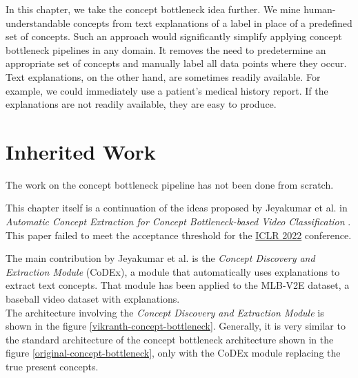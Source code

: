 In this chapter, we take the concept bottleneck idea further.
We mine human-understandable concepts from text explanations of a label in place of a predefined set of concepts.
Such an approach would significantly simplify applying concept bottleneck pipelines in any domain.
It removes the need to predetermine an appropriate set of concepts and manually label all data points where they occur.
Text explanations, on the other hand, are sometimes readily available. For example, we could immediately use a patient's medical history report.
If the explanations are not readily available, they are easy to produce.


\section{Inherited Work}
\label{inherited-work}

The work on the concept bottleneck pipeline has not been done from scratch.

This chapter itself is a continuation of the ideas proposed by Jeyakumar et al. in \emph{Automatic Concept Extraction for Concept Bottleneck-based Video Classification} \cite{RefWorks:RefID:16-2021automatic}. This paper failed to meet the acceptance threshold for the \href{https://iclr.cc/}{ICLR 2022} conference. 

The main contribution by Jeyakumar et al. is the \emph{Concept Discovery and Extraction Module} (CoDEx), a module that automatically uses explanations to extract text concepts.
That module has been applied to the MLB-V2E dataset, a baseball video dataset with explanations. \\
The architecture involving the \emph{Concept Discovery and Extraction Module} is shown in the figure \ref{vikranth-concept-bottleneck}. 
Generally, it is very similar to the standard architecture of the concept bottleneck architecture shown in the figure \ref{original-concept-bottleneck}, only with the CoDEx module replacing the true present concepts.

